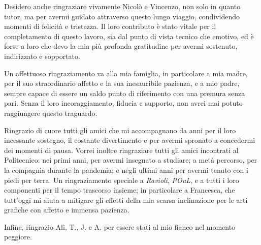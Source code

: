 \documentclass{Configuration_Files/PoliMi3i_thesis}
\begin{document}
Desidero anche ringraziare vivamente Nicolò e Vincenzo, non solo in quanto tutor, ma per avermi guidato attraverso questo lungo viaggio, condividendo momenti di felicità e tristezza.
Il loro contributo è stato vitale per il completamento di questo lavoro, sia dal punto di vista tecnico che emotivo, ed è forse a loro che devo la mia più profonda gratitudine per avermi sostenuto, indirizzato e sopportato.

Un affettuoso ringraziamento va alla mia famiglia, in particolare a mia madre, per il suo straordinario affetto e la sua inesauribile pazienza, e a mio padre, sempre capace di essere un saldo punto di riferimento con una premura senza pari.
Senza il loro incoraggiamento, fiducia e supporto, non avrei mai potuto raggiungere questo traguardo.

Ringrazio di cuore tutti gli amici che mi accompagnano da anni per il loro incessante sostegno, il costante divertimento e per avermi spronato a concedermi dei momenti di pausa.
Vorrei inoltre ringraziare tutti gli amici incontrati al Politecnico: nei primi anni, per avermi insegnato a studiare; a metà percorso, per la compagnia durante la pandemia; e negli ultimi anni per avermi tenuto con i piedi per terra.
Un ringraziamento speciale a \emph{Ravioli}, \emph{POuL}, e a tutti i loro componenti per il tempo trascorso insieme; in particolare a Francesca, che tutt'oggi mi aiuta a mitigare gli effetti della mia scarsa inclinazione per le arti grafiche con affetto e immensa pazienza.

Infine, ringrazio Ali, T., J. e A. per essere stati al mio fianco nel momento peggiore.

\cleardoublepage
\end{document}
